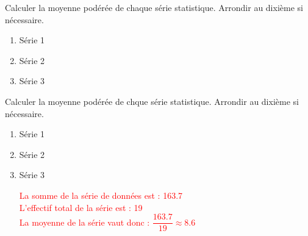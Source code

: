 \begin{exercice*}
    Calculer la moyenne podérée de chaque série statistique. Arrondir au dixième si nécessaire.
    \begin{enumerate}
        \item Série 1\par\smallskip
        \smallskip
        \item Série 2\par\smallskip
        \smallskip
        \item Série 3\par\smallskip
        \smallskip
    \end{enumerate}
\end{exercice*}
\begin{corrige}
    Calculer la moyenne podérée de chque série statistique. Arrondir au dixième si nécessaire.
    \begin{enumerate}
        \item Série 1\par\smallskip
        \hspace*{-5mm}
        \par\smallskip
        \textcolor{red}{
        }
        \item Série 2\par\smallskip
        \hspace*{-5mm}
        \par\smallskip
        \textcolor{red}{
        }
        \item Série 3\par\smallskip
        \hspace*{-5mm}
        \par\smallskip
        \textcolor{red}{
            La somme de la série de données est : \num{163.7}\\
            L'effectif total de la série est : \num{19}\\
            La moyenne de la série vaut donc : $\dfrac{\num{163.7}}{19}\approx \num{8.6}$
        }
    \end{enumerate}
\end{corrige}

